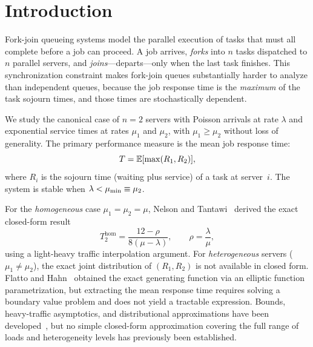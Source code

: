 \section{Introduction}
\label{sec:intro}

Fork-join queueing systems model the parallel execution of tasks that must
all complete before a job can proceed.
A job arrives, \emph{forks} into $n$ tasks dispatched to $n$ parallel servers,
and \emph{joins}---departs---only when the last task finishes.
This synchronization constraint makes fork-join queues substantially harder
to analyze than independent queues, because the job response time is the
\emph{maximum} of the task sojourn times, and those times are stochastically
dependent.

We study the canonical case of $n = 2$ servers with Poisson arrivals at
rate $\lambda$ and exponential service times at rates $\mu_1$ and $\mu_2$,
with $\mu_1 \geq \mu_2$ without loss of generality.
The primary performance measure is the mean job response time:
\begin{equation}
  T = \mathbb{E}[\max(R_1, R_2)],
\end{equation}
where $R_i$ is the sojourn time (waiting plus service) of a task at server~$i$.
The system is stable when $\lambda < \mu_{\min} \equiv \mu_2$.

For the \emph{homogeneous} case $\mu_1 = \mu_2 = \mu$, Nelson and
Tantawi~\citep{Nelson1988} derived the exact closed-form result
\begin{equation}
  \label{eq:nelson-tantawi}
  T_2^{\mathrm{hom}} = \frac{12 - \rho}{8(\mu - \lambda)},
  \qquad \rho = \frac{\lambda}{\mu},
\end{equation}
using a light-heavy traffic interpolation argument.
For \emph{heterogeneous} servers ($\mu_1 \neq \mu_2$), the exact joint
distribution of $(R_1, R_2)$ is not available in closed form.
Flatto and Hahn~\citep{Flatto1984,Flatto1985} obtained the exact generating
function via an elliptic function parametrization, but extracting the mean
response time requires solving a boundary value problem and does not yield
a tractable expression.
Bounds, heavy-traffic asymptotics, and distributional
approximations have been developed~\citep{Baccelli1989,Kemper2012,Rizk2015,Mohanty2024},
but no simple closed-form approximation covering the full range of loads and
heterogeneity levels has previously been established.

